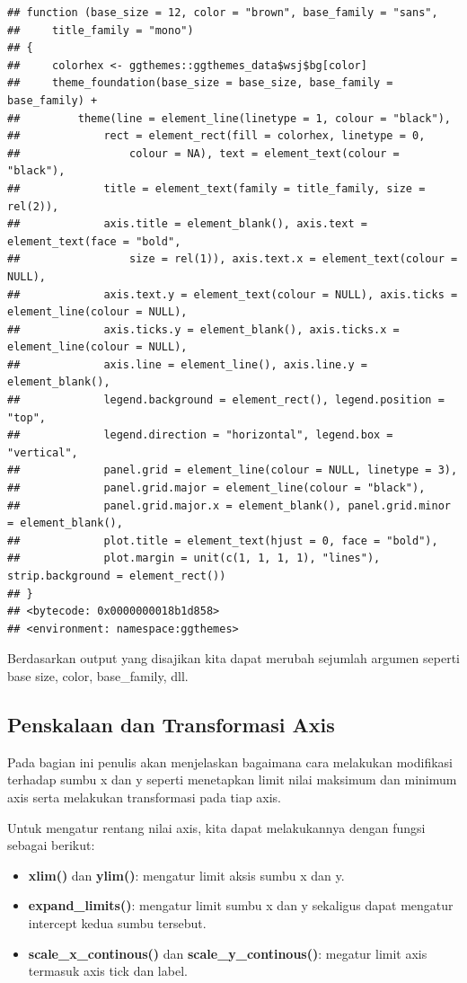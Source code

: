 \documentclass[]{book}
\providecommand{\tightlist}{%
  \setlength{\itemsep}{0pt}\setlength{\parskip}{0pt}}
\begin{document}
\begin{verbatim}
## function (base_size = 12, color = "brown", base_family = "sans", 
##     title_family = "mono") 
## {
##     colorhex <- ggthemes::ggthemes_data$wsj$bg[color]
##     theme_foundation(base_size = base_size, base_family = base_family) + 
##         theme(line = element_line(linetype = 1, colour = "black"), 
##             rect = element_rect(fill = colorhex, linetype = 0, 
##                 colour = NA), text = element_text(colour = "black"), 
##             title = element_text(family = title_family, size = rel(2)), 
##             axis.title = element_blank(), axis.text = element_text(face = "bold", 
##                 size = rel(1)), axis.text.x = element_text(colour = NULL), 
##             axis.text.y = element_text(colour = NULL), axis.ticks = element_line(colour = NULL), 
##             axis.ticks.y = element_blank(), axis.ticks.x = element_line(colour = NULL), 
##             axis.line = element_line(), axis.line.y = element_blank(), 
##             legend.background = element_rect(), legend.position = "top", 
##             legend.direction = "horizontal", legend.box = "vertical", 
##             panel.grid = element_line(colour = NULL, linetype = 3), 
##             panel.grid.major = element_line(colour = "black"), 
##             panel.grid.major.x = element_blank(), panel.grid.minor = element_blank(), 
##             plot.title = element_text(hjust = 0, face = "bold"), 
##             plot.margin = unit(c(1, 1, 1, 1), "lines"), strip.background = element_rect())
## }
## <bytecode: 0x0000000018b1d858>
## <environment: namespace:ggthemes>
\end{verbatim}

Berdasarkan output yang disajikan kita dapat merubah sejumlah argumen
seperti base size, color, base\_family, dll.

\subsection{Penskalaan dan Transformasi
Axis}\label{penskalaan-dan-transformasi-axis}

Pada bagian ini penulis akan menjelaskan bagaimana cara melakukan
modifikasi terhadap sumbu x dan y seperti menetapkan limit nilai
maksimum dan minimum axis serta melakukan transformasi pada tiap axis.

Untuk mengatur rentang nilai axis, kita dapat melakukannya dengan fungsi
sebagai berikut:

\begin{itemize}
\tightlist
\item
  \textbf{xlim()} dan \textbf{ylim()}: mengatur limit aksis sumbu x dan
  y.
\item
  \textbf{expand\_limits()}: mengatur limit sumbu x dan y sekaligus
  dapat mengatur intercept kedua sumbu tersebut.
\item
  \textbf{scale\_x\_continous()} dan \textbf{scale\_y\_continous()}:
  megatur limit axis termasuk axis tick dan label.
\end{itemize}
\end{document}
